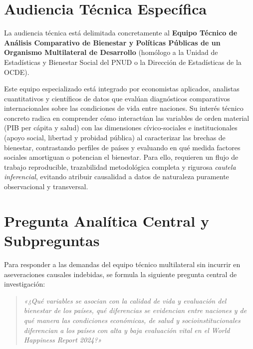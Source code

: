 \documentclass[11pt]{article}
\begin{document}
\section{Audiencia Técnica Específica}

La audiencia técnica está delimitada concretamente al \textbf{Equipo Técnico de Análisis Comparativo de Bienestar y Políticas Públicas de un Organismo Multilateral de Desarrollo} (homólogo a la Unidad de Estadísticas y Bienestar Social del PNUD o la Dirección de Estadísticas de la OCDE).

Este equipo especializado está integrado por economistas aplicados, analistas cuantitativos y científicos de datos que evalúan diagnósticos comparativos internacionales sobre las condiciones de vida entre naciones. Su interés técnico concreto radica en comprender cómo interactúan las variables de orden material (PIB per cápita y salud) con las dimensiones cívico-sociales e institucionales (apoyo social, libertad y probidad pública) al caracterizar las brechas de bienestar, contrastando perfiles de países y evaluando en qué medida factores sociales amortiguan o potencian el bienestar. Para ello, requieren un flujo de trabajo reproducible, trazabilidad metodológica completa y rigurosa \textit{cautela inferencial}, evitando atribuir causalidad a datos de naturaleza puramente observacional y transversal.

\section{Pregunta Analítica Central y Subpreguntas}

Para responder a las demandas del equipo técnico multilateral sin incurrir en aseveraciones causales indebidas, se formula la siguiente pregunta central de investigación:

\begin{quote}
\textit{«¿Qué variables se asocian con la calidad de vida y evaluación del bienestar de los países, qué diferencias se evidencian entre naciones y de qué manera las condiciones económicas, de salud y socioinstitucionales diferencian a los países con alta y baja evaluación vital en el World Happiness Report 2024?»}
\end{quote}
\end{document}
